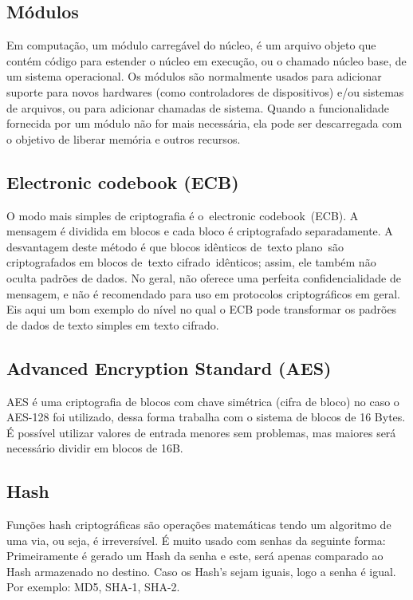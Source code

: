 \subsection{Módulos}

Em computação, um módulo carregável do núcleo, é um arquivo objeto que contém código para estender o núcleo em execução, ou o chamado núcleo base, de um sistema operacional. Os módulos são normalmente usados para adicionar suporte para novos hardwares (como controladores de dispositivos) e/ou sistemas de arquivos, ou para adicionar chamadas de sistema. Quando a funcionalidade fornecida por um módulo não for mais necessária, ela pode ser descarregada com o objetivo de liberar memória e outros recursos.

\subsection{Electronic codebook (ECB)}

O modo mais simples de criptografia é o electronic codebook (ECB). A mensagem é dividida em blocos e cada bloco é criptografado separadamente. A desvantagem deste método é que blocos idênticos de texto plano são criptografados em blocos de texto cifrado idênticos; assim, ele também não oculta padrões de dados. No geral, não oferece uma perfeita confidencialidade de mensagem, e não é recomendado para uso em protocolos criptográficos em geral.
Eis aqui um bom exemplo do nível no qual o ECB pode transformar os padrões de dados de texto simples em texto cifrado.

\subsection{Advanced Encryption Standard (AES)}

AES é uma criptografia de blocos com chave simétrica (cifra de bloco) no caso o AES-128 foi utilizado, dessa forma trabalha com o sistema de blocos de 16 Bytes. É possível utilizar valores de entrada menores sem problemas, mas maiores será necessário dividir em blocos de 16B.

\subsection{Hash}

Funções hash criptográficas são operações matemáticas tendo um algoritmo de uma via, ou seja, é irreversível. É muito usado com senhas da seguinte forma: Primeiramente é gerado um Hash da senha e este, será apenas comparado ao Hash armazenado no destino. Caso os Hash’s sejam iguais, logo a senha é igual. Por exemplo: MD5, SHA-1, SHA-2.

